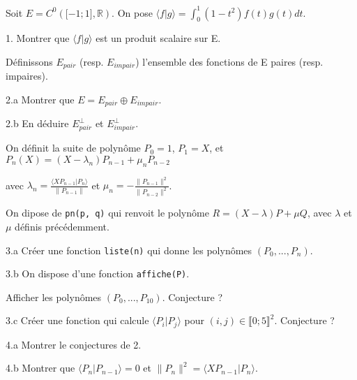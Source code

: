 
\vspace{-10pt}
\noindent Soit $E = C^0\left(\lbrack -1; 1 \rbrack, \mathbb{R} \right).$
          On pose $\displaystyle \langle f|g \rangle = \int_{0}^{1} \left(1-t^2\right)f(t)g(t)dt$.

\vspace{5pt}
1. Montrer que $\langle f|g \rangle$ est un produit scalaire sur E.

\vspace{5pt}
\noindent Définissons $E_{pair}$ (resp. $E_{impair}$) l'ensemble des fonctions de E paires (resp. impaires).

\vspace{5pt}
2.a Montrer que $E = E_{pair} \oplus E_{impair}$.

\vspace{5pt}
2.b En déduire $E_{pair}^{\perp}$ et $E_{impair}^{\perp}$.

\vspace{10pt}
\noindent On définit la suite de polynôme $P_0 = 1$, $P_1 = X$, et $P_n(X) = (X-\lambda_n)P_{n-1} + \mu_nP_{n-2}$

\vspace{5pt}
\noindent avec $\displaystyle \lambda_n = \frac {\langle XP_{n-1} | P_n \rangle} {\|P_{n-1}\|}$
          et $\displaystyle \mu_n = - \frac {\| P_{n-1} \|^2} {\| P_{n-2} \|^2}$.

\vspace{5pt}
\noindent On dipose de \lstinline {pn(p, q)} qui renvoit le polynôme $R = (X - \lambda)P + \mu Q$, avec $\lambda$ et $\mu$ définis précédemment.

\vspace{5pt}
3.a Créer une fonction \lstinline {liste(n)} qui donne les polynômes $(P_0, ..., P_n)$.

\vspace{5pt}
3.b On dispose d'une fonction \lstinline {affiche(P)}.

Afficher les polynômes $(P_0, ..., P_{10})$. Conjecture ?

\vspace{5pt}
3.c Créer une fonction qui calcule $\langle P_i|P_j \rangle$ pour $(i, j) \in \llbracket 0;5 \rrbracket^2$. Conjecture ?

\vspace{5pt}
4.a Montrer le conjectures de 2.

\vspace{5pt}
4.b Montrer que $\langle P_n | P_{n-1} \rangle = 0$ et $\|P_n\|^2 = \langle XP_{n-1} | P_n \rangle$.

